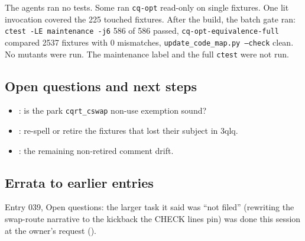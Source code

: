 The agents ran no tests. Some ran \texttt{cq-opt} read-only on single fixtures. One lit
invocation covered the 225 touched fixtures. After the build, the batch gate ran:
\texttt{ctest -LE maintenance -j6} 586 of 586 passed, \texttt{cq-opt-equivalence-full} compared 2537 fixtures with 0 mismatches, \texttt{update\_code\_map.py --check} clean. No mutants were run. The maintenance label and the full \texttt{ctest} were
not run.

\subsection*{Open questions and next steps}
\begin{itemize}
  \item {}: is the park \texttt{cqrt\_cswap} non-use exemption
  sound?
  \item {}: re-spell or retire the fixtures that lost their
  subject in 3qlq.
  \item {}: the remaining non-retired comment drift.
\end{itemize}

\subsection*{Errata to earlier entries}
Entry 039, Open questions: the larger task it said was ``not filed'' (rewriting the
swap-route narrative to the kickback the CHECK lines pin) was done this session at the
owner's request ().
